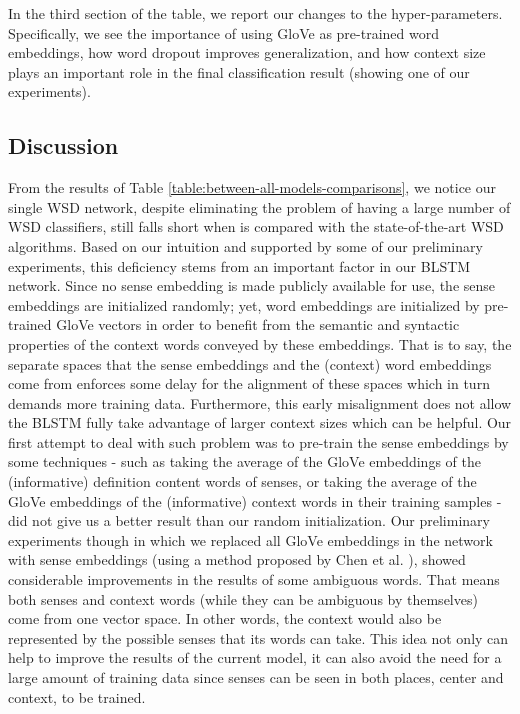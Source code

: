 \documentclass{llncs}
\begin{document}
In the third section of the table, we report our changes to the hyper-parameters. Specifically, we see the importance of using GloVe as pre-trained word embeddings, how word dropout improves generalization, and how context size plays an important role in the final classification result (showing one of our experiments).

\subsection{Discussion}
From the results of Table \ref{table:between-all-models-comparisons}, we notice our single WSD network, despite eliminating the problem of having a large number of WSD classifiers, still falls short when is compared with the state-of-the-art WSD algorithms. Based on our intuition and supported by some of our preliminary experiments, this deficiency stems from an important factor in our BLSTM network. Since no sense embedding is made publicly available for use, the sense embeddings are initialized randomly; yet, word embeddings are initialized by pre-trained GloVe vectors in order to benefit from the semantic and syntactic properties of the context words conveyed by these embeddings. That is to say, the separate spaces that the sense embeddings and the (context) word embeddings come from enforces some delay for the alignment of these spaces which in turn demands more training data. Furthermore, this early misalignment does not allow the BLSTM fully take advantage of larger context sizes which can be helpful. Our first attempt to deal with such problem was to pre-train the sense embeddings by some techniques - such as taking the average of the GloVe embeddings of the (informative) definition content words of senses, or taking the average of the GloVe embeddings of the (informative) context words in their training samples - did not give us a better result than our random initialization. Our preliminary experiments though in which we replaced all GloVe embeddings in the network with sense embeddings (using a method proposed by Chen et al. \cite{chen2014unified}), showed considerable improvements in the results of some ambiguous words. That means both senses and context words (while they can be ambiguous by themselves) come from one vector space. In other words, the context would also be represented by the possible senses that its words can take. This idea not only can help to improve the results of the current model, it can also avoid the need for a large amount of training data since senses can be seen in both places, center and context, to be trained.
\end{document}
